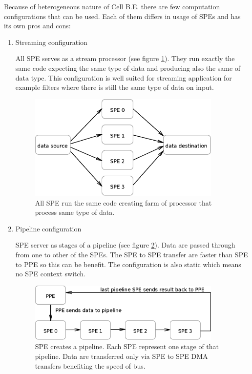 \par
Because of heterogeneous nature of Cell B.E. there are few computation configurations that can be used.
Each of them differs in usage of SPEs and has its own pros and cons:
\begin{enumerate}
\item Streaming configuration
\par
All SPE serves as a stream processor (see figure \ref{fg:streamingModel}).
They run exactly the same code expecting the same type of data and producing also the same of data type.
This configuration is well suited for streaming application for example filters where there is still the same type of data on input.

\begin{figure}
    \centering
    \includegraphics[width=0.9\textwidth]{data/streamingModel}
    \caption[Streaming SPE configuration]{All SPE run the same code creating farm of processor that process same type of data.}
    \label{fg:streamingModel}
\end{figure}

\item Pipeline configuration
\par
SPE server as stages of a pipeline (see figure \ref{fg:pipelineModel}).
Data are passed through from one to other of the SPEs.
The SPE to SPE transfer are faster than SPE to PPE so this can be benefit.
The configuration is also static which means no SPE context switch.

\begin{figure}
    \centering
    \includegraphics[width=0.9\textwidth]{data/pipelineModel}
    \caption[Pipeline SPE configuration]{SPE creates a pipeline. Each SPE represent one stage of that pipeline. Data are transferred only via SPE to SPE DMA transfers benefiting the speed of bus.}
    \label{fg:pipelineModel}
\end{figure}


\end{enumerate}
